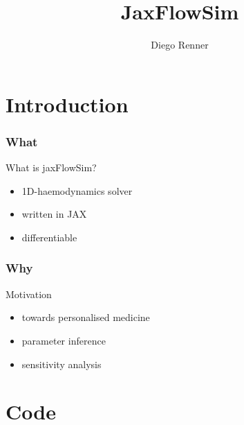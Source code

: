\documentclass{beamer}
\title{JaxFlowSim}
\author{Diego Renner}
\begin{document}
\section{Introduction}
\maketitle

\begin{frame}
	\frametitle{What}
	\begin{block}{What is jaxFlowSim?}
		\begin{itemize}
			\item 1D-haemodynamics solver
			\item written in JAX
			\item differentiable
		\end{itemize}
	\end{block}
	\vspace{5mm}
\end{frame}

\begin{frame}
	\frametitle{Why}
	\begin{block}{Motivation}
		\begin{itemize}
			\item towards personalised medicine
			\item parameter inference
			\item sensitivity analysis
		\end{itemize}
	\end{block}
	\vspace{5mm}
\end{frame}


\section{Code}
\end{document}
